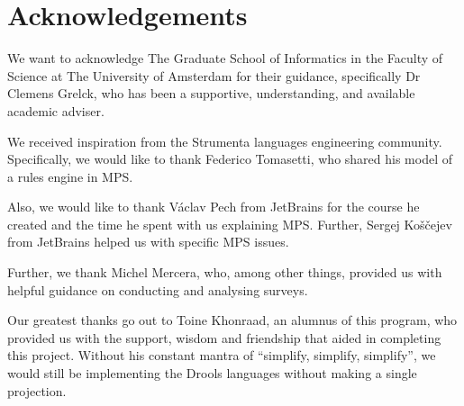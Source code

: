 \chapter*{Acknowledgements}

We want to acknowledge The Graduate School of Informatics in the Faculty of Science at The University of Amsterdam for their guidance, specifically Dr Clemens Grelck, who has been a supportive, understanding, and available academic adviser.


We received inspiration from the Strumenta languages engineering community.
Specifically, we would like to thank Federico Tomasetti, who shared his model of a rules engine in MPS.


Also, we would like to thank Václav Pech from JetBrains for the course he created and the time he spent with us explaining MPS.
Further, Sergej Koščejev from JetBrains helped us with specific MPS issues.


Further, we thank Michel Mercera, who, among other things, provided us with helpful guidance on conducting and analysing surveys.


Our greatest thanks go out to Toine Khonraad, an alumnus of this program, who provided us with the support, wisdom and friendship that aided in completing this project.
Without his constant mantra of ``simplify, simplify, simplify'', we would still be implementing the Drools languages without making a single projection.
